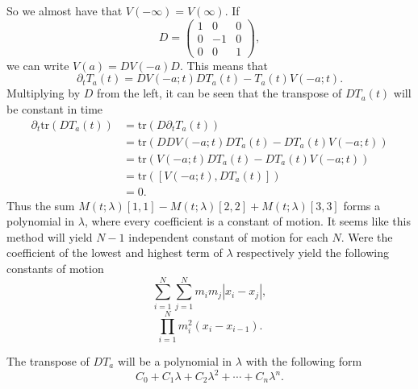 \documentclass[english,master]{liumaiex}
\theoremstyle{plain}
\theoremstyle{definition}
\newcommand{\tr}{\text{tr}}
\begin{document}
So we almost have that $V(-\infty) = V(\infty)$. If
\begin{equation}
	D = 
\begin{pmatrix}
	1 & 0 & 0 \\
	0 & -1 & 0 \\
	0 & 0 & 1
\end{pmatrix},
\end{equation}
%
we can write $V(a) = DV(-a)D$. This means that 
\begin{equation}
	\partial_t T_a(t) = DV(-a;t)DT_a(t) - T_a(t)V(-a;t).
\end{equation}
Multiplying by $D$ from the left, it can be seen that the transpose of $DT_a(t)$ will be constant in time
\begin{equation}
\begin{aligned}
	\partial_t \tr(D T_a(t))
	&= \tr(D \partial_t T_a(t)) \\
	&= \tr(DDV(-a;t)DT_a(t) - DT_a(t)V(-a;t)) \\
	&= \tr(V(-a;t)DT_a(t) - DT_a(t)V(-a;t)) \\
	&= \tr([V(-a;t), DT_a(t)]) \\
	&= 0.
\end{aligned}
\end{equation}
Thus the sum $M(t;\lambda)[1,1] - M(t;\lambda)[2,2] + M(t;\lambda)[3,3]$ forms a polynomial in $\lambda$, where every coefficient is a constant of motion. It seems like this method will yield $N-1$ independent constant of motion for each $N$. Were the coefficient of the lowest and highest term of $\lambda$ respectively yield the following constants of motion
\begin{equation}
	\sum_{i=1}^{N}\sum_{j=1}^N m_i m_j |x_i - x_j|,
\end{equation}
\begin{equation}
	\prod_{i=1}^{N} m_i^2 (x_i - x_{i-1}).
\end{equation}

The transpose of $DT_a$ will be a polynomial in $\lambda$ with the following form
\begin{equation}
	C_0 + C_1 \lambda + C_2 \lambda^2 + \cdots + C_{n} \lambda^{n}.
\end{equation}
\end{document}
